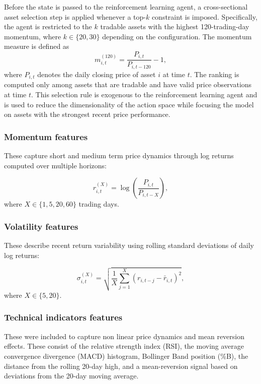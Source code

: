 \documentclass[]{elsarticle}
\begin{document}
Before the state is passed to the reinforcement learning agent, a cross-sectional asset selection step is applied whenever a top-\(k\) constraint is imposed. Specifically, the agent is restricted to the \(k\) tradable assets with the highest 120-trading-day momentum, where \(k \in \{20,30\}\) depending on the configuration. The momentum measure is defined as
\begin{equation}
m_{i,t}^{(120)} = \frac{P_{i,t}}{P_{i,t-120}} - 1,
\end{equation}
where \(P_{i,t}\) denotes the daily closing price of asset \(i\) at time \(t\). The ranking is computed only among assets that are tradable and have valid price observations at time \(t\). This selection rule is exogenous to the reinforcement learning agent and is used to reduce the dimensionality of the action space while focusing the model on assets with the strongest recent price performance.

\subsubsection{Momentum features}
 
These capture short and medium term price dynamics through log returns computed over multiple horizons:

\begin{equation}
r^{(X)}_{i,t} = \log\left(\frac{P_{i,t}}{P_{i,t-X}}\right),
\end{equation}
where \(X \in \{1,5,20,60\}\) trading days.

\subsubsection{Volatility features}

These describe recent return variability using rolling standard deviations of daily log returns:

\begin{equation}
\sigma^{(X)}_{i,t} =
\sqrt{
\frac{1}{X}
\sum_{j=1}^{X}
\left(r_{i,t-j} - \bar{r}_{i,t}\right)^2
},
\end{equation}
where \(X \in \{5,20\}\).

\subsubsection{Technical indicators features}

These were included to capture non linear price dynamics and mean reversion effects. These consist of the relative strength index (RSI), the moving average convergence divergence (MACD) histogram, Bollinger Band position (\%B), the distance from the rolling 20-day high, and a mean-reversion signal based on deviations from the 20-day moving average.
\end{document}
